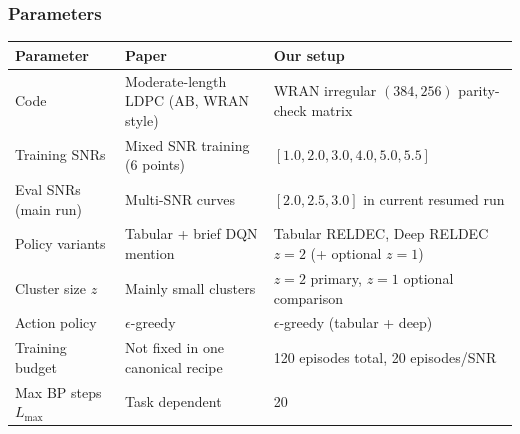 \documentclass{beamer}
\begin{document}


\begin{frame}
\frametitle{Parameters}

\scriptsize
\begin{tabular}{|p{2.8cm}|p{3.4cm}|p{4.2cm}|}
\hline
\textbf{Parameter} & \textbf{Paper} & \textbf{Our setup} \\
\hline
Code & Moderate-length LDPC (AB, WRAN style) & WRAN irregular $(384,256)$ parity-check matrix \\
\hline
Training SNRs & Mixed SNR training (6 points) & $[1.0,2.0,3.0,4.0,5.0,5.5]$ \\
\hline
Eval SNRs (main run) & Multi-SNR curves & $[2.0,2.5,3.0]$ in current resumed run \\
\hline
Policy variants & Tabular + brief DQN mention & Tabular RELDEC, Deep RELDEC $z=2$ (+ optional $z=1$) \\
\hline
Cluster size $z$ & Mainly small clusters & $z=2$ primary, $z=1$ optional comparison \\
\hline
Action policy & $\epsilon$-greedy & $\epsilon$-greedy (tabular + deep) \\
\hline
Training budget & Not fixed in one canonical recipe & 120 episodes total, 20 episodes/SNR \\
\hline
Max BP steps $L_{\max}$ & Task dependent & 20 \\
\hline
\end{tabular}

\end{frame}

\end{document}
